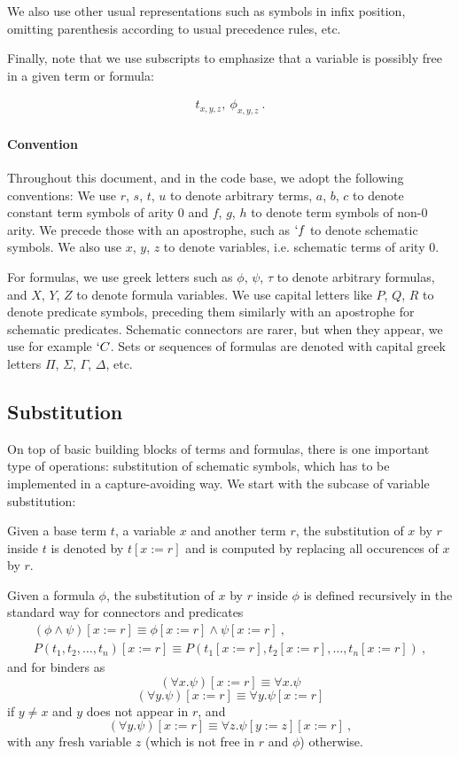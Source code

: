 We also use other usual representations such as symbols in infix position, omitting parenthesis according to usual precedence rules, etc.

Finally, note that we use subscripts to emphasize that a variable is possibly free in a given term or formula:

\begin{gather*}
  t_{x,y,z}, ~\phi_{x,y,z}~.
\end{gather*}

\paragraph{Convention} Throughout this document, and in the code base, we adopt the following conventions: We use $r$, $s$, $t$, $u$ to denote arbitrary terms, $a$, $b$, $c$ to denote constant term symbols of arity $0$ and $f$, $g$, $h$ to denote term symbols of non-0 arity. We precede those with an apostrophe, such as $`f$ to denote schematic symbols. We also use $x$, $y$, $z$ to denote variables, i.e. schematic terms of arity $0$.

For formulas, we use greek letters such as $\phi$, $\psi$, $\tau$ to denote arbitrary formulas, and $X$, $Y$, $Z$ to denote formula variables. We use capital letters like $P$, $Q$, $R$ to denote predicate symbols, preceding them similarly with an apostrophe for schematic predicates. Schematic connectors are rarer, but when they appear, we use for example $`C$. Sets or sequences of formulas are denoted with capital greek letters $\Pi$, $\Sigma$, $\Gamma$, $\Delta$, etc.

\subsection{Substitution}
\label{subsec:substitution}
On top of basic building blocks of terms and formulas, there is one important type of operations: substitution of schematic symbols, which has to be implemented in a capture-avoiding way. We start with the subcase of variable substitution:
\begin{definition}
  Given a base term $t$, a variable $x$ and another term $r$, the substitution of $x$ by $r$ inside $t$ is denoted by $ t[x := r] $ and is computed by replacing all occurences of $x$ by $r$.

  Given a formula $\phi$, the substitution of $x$ by $r$ inside $\phi$ is defined recursively in the standard way for connectors and predicates
  \begin{gather*}
    (\phi \land \psi)[x := r] \equiv \phi[x := r] \land \psi[x := r]~,\\
    P(t_1, t_2, \ldots, t_n)[x := r] \equiv P(t_1[x := r], t_2[x := r], \ldots, t_n[x := r])~,
  \end{gather*}
  and for binders as
  $$
    (\forall x. \psi)[x := r] \equiv \forall x. \psi
  $$
  $$
    (\forall y. \psi)[x := r] \equiv \forall y. \psi[x := r]
  $$
  if $y \neq x$ and $y$ does not appear in $r$, and
  $$
    (\forall y. \psi)[x := r] \equiv \forall z. \psi[y := z][x := r]~,
  $$
  with any fresh variable $z$ (which is not free in $r$ and $\phi$) otherwise.
\end{definition}


